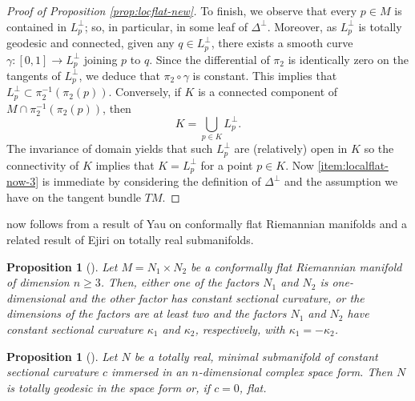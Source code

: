 \documentclass[a4paper,leqno,11pt]{amsart}
\numberwithin{equation}{section}
\newtheorem{proposition}[theorem]{Proposition}
\theoremstyle{remark}
\theoremstyle{remark}
\begin{document}
\begin{proof}[Proof of Proposition \ref{prop:locflat-new}]
To finish, we observe that every $p \in M$ is contained in $L_p^{\perp}$; so, in particular, in some leaf of $\Delta^{\perp}$. Moreover, as $L_p^{\perp}$ is totally geodesic and connected, given any $q \in L_p^{\perp}$, there exists a smooth curve $\gamma \colon [0,1] \rightarrow L_p^{\perp}$ joining $p$ to $q$. Since the differential of $\pi_2$ is identically zero on the tangents of $L_p^{\perp}$, we deduce that $\pi_2 \circ \gamma$ is constant. This implies that $L_p^{\perp} \subset \pi_2^{-1}( \pi_2(p) )$. Conversely, if $K$ is a connected component of $M \cap \pi_2^{-1}( \pi_2(p) )$, then 
\begin{equation*}
    K = \bigcup_{ p \in K } L_p^{\perp}.
\end{equation*}
The invariance of domain yields that such $L_p^{\perp}$ are (relatively) open in $K$ so the connectivity of $K$ implies that $K = L_p^{\perp}$ for a point $p \in K$. Now \eqref{item:localflat-now-3} is immediate by considering the definition of $\Delta^{\perp}$ and the assumption we have on the tangent bundle $TM$.
\end{proof}






 now follows from a result of Yau on conformally flat Riemannian manifolds and a related result of Ejiri on totally real submanifolds.

\begin{proposition}[{\cite[Theorem 4]{Yau:73}}]
\label{prop:conformallyflat:product}
Let $M = N_1 \times N_2$ be a conformally flat Riemannian manifold of dimension $n \geq 3$. Then, either one of the factors $N_1$ and $N_2$ is one-dimensional and the other factor has constant sectional curvature, or the dimensions of the factors are at least two and the factors $N_1$ and $N_2$ have constant sectional curvature $\kappa_1$ and $\kappa_2$, respectively, with $\kappa_1 = -\kappa_2$.
\end{proposition}

\begin{proposition}[{\cite{Eji:82}}]
\label{prop:conformallyflat:product-real}
Let $N$ be a totally real, minimal submanifold of constant sectional curvature $c$ immersed in an $n$-dimensional complex space form. Then $N$ is totally geodesic in the space form or, if $c=0$, flat.
\end{proposition}
\end{document}
